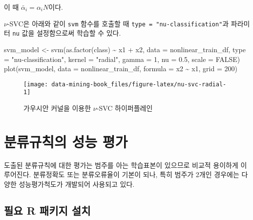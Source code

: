 \documentclass[
]{book}
\newenvironment{Shaded}{\begin{snugshade}}{\end{snugshade}}
\newcommand{\AttributeTok}[1]{\textcolor[rgb]{0.77,0.63,0.00}{#1}}
\newcommand{\ConstantTok}[1]{\textcolor[rgb]{0.00,0.00,0.00}{#1}}
\newcommand{\DecValTok}[1]{\textcolor[rgb]{0.00,0.00,0.81}{#1}}
\newcommand{\FloatTok}[1]{\textcolor[rgb]{0.00,0.00,0.81}{#1}}
\newcommand{\FunctionTok}[1]{\textcolor[rgb]{0.00,0.00,0.00}{#1}}
\newcommand{\NormalTok}[1]{#1}
\newcommand{\OtherTok}[1]{\textcolor[rgb]{0.56,0.35,0.01}{#1}}
\newcommand{\SpecialCharTok}[1]{\textcolor[rgb]{0.00,0.00,0.00}{#1}}
\newcommand{\StringTok}[1]{\textcolor[rgb]{0.31,0.60,0.02}{#1}}
\begin{document}
이 때 \(\bar{\alpha}_i = \alpha_i N\)이다.

\(\nu\)-SVC은 아래와 같이 \texttt{svm} 함수를 호출할 때 \texttt{type\ =\ "nu-classification"}과 파라미터 \texttt{nu} 값을 설정함으로써 학습할 수 있다.

\begin{Shaded}
\begin{Highlighting}[]
\NormalTok{svm\_model }\OtherTok{\textless{}{-}} \FunctionTok{svm}\NormalTok{(}\FunctionTok{as.factor}\NormalTok{(class) }\SpecialCharTok{\textasciitilde{}}\NormalTok{ x1 }\SpecialCharTok{+}\NormalTok{ x2, }\AttributeTok{data =}\NormalTok{ nonlinear\_train\_df, }
                 \AttributeTok{type =} \StringTok{"nu{-}classification"}\NormalTok{, }
                 \AttributeTok{kernel =} \StringTok{"radial"}\NormalTok{, }\AttributeTok{gamma =} \DecValTok{1}\NormalTok{,}
                 \AttributeTok{nu =} \FloatTok{0.5}\NormalTok{, }\AttributeTok{scale =} \ConstantTok{FALSE}\NormalTok{)}
\FunctionTok{plot}\NormalTok{(svm\_model, }\AttributeTok{data =}\NormalTok{ nonlinear\_train\_df, }\AttributeTok{formula =}\NormalTok{ x2 }\SpecialCharTok{\textasciitilde{}}\NormalTok{ x1, }\AttributeTok{grid =} \DecValTok{200}\NormalTok{)}
\end{Highlighting}
\end{Shaded}

\begin{figure}

{\centering \texttt{[image: data-mining-book\_files/figure-latex/nu-svc-radial-1]} 

}

\caption{가우시안 커널을 이용한 $\nu$-SVC 하이퍼플레인}\label{fig:nu-svc-radial}
\end{figure}

\hypertarget{classifier-evaluation}{%
\chapter{분류규칙의 성능 평가}\label{classifier-evaluation}}

도출된 분류규칙에 대한 평가는 범주를 아는 학습표본이 있으므로 비교적 용이하게 이루어진다. 분류정확도 또는 분류오류율이 기본이 되나, 특히 범주가 2개인 경우에는 다양한 성능평가척도가 개발되어 사용되고 있다.

\hypertarget{classifier-evaluation-packages-install}{%
\section{필요 R 패키지 설치}\label{classifier-evaluation-packages-install}}
\end{document}
